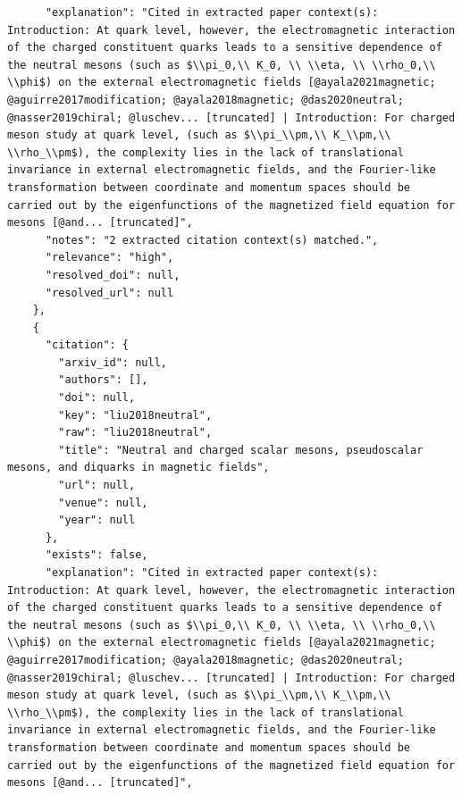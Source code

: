 \documentclass[11pt]{article}
\begin{document}
\begin{verbatim}
      "explanation": "Cited in extracted paper context(s): Introduction: At quark level, however, the electromagnetic interaction of the charged constituent quarks leads to a sensitive dependence of the neutral mesons (such as $\\pi_0,\\ K_0, \\ \\eta, \\ \\rho_0,\\ \\phi$) on the external electromagnetic fields [@ayala2021magnetic; @aguirre2017modification; @ayala2018magnetic; @das2020neutral; @nasser2019chiral; @luschev... [truncated] | Introduction: For charged meson study at quark level, (such as $\\pi_\\pm,\\ K_\\pm,\\ \\rho_\\pm$), the complexity lies in the lack of translational invariance in external electromagnetic fields, and the Fourier-like transformation between coordinate and momentum spaces should be carried out by the eigenfunctions of the magnetized field equation for mesons [@and... [truncated]",
      "notes": "2 extracted citation context(s) matched.",
      "relevance": "high",
      "resolved_doi": null,
      "resolved_url": null
    },
    {
      "citation": {
        "arxiv_id": null,
        "authors": [],
        "doi": null,
        "key": "liu2018neutral",
        "raw": "liu2018neutral",
        "title": "Neutral and charged scalar mesons, pseudoscalar mesons, and diquarks in magnetic fields",
        "url": null,
        "venue": null,
        "year": null
      },
      "exists": false,
      "explanation": "Cited in extracted paper context(s): Introduction: At quark level, however, the electromagnetic interaction of the charged constituent quarks leads to a sensitive dependence of the neutral mesons (such as $\\pi_0,\\ K_0, \\ \\eta, \\ \\rho_0,\\ \\phi$) on the external electromagnetic fields [@ayala2021magnetic; @aguirre2017modification; @ayala2018magnetic; @das2020neutral; @nasser2019chiral; @luschev... [truncated] | Introduction: For charged meson study at quark level, (such as $\\pi_\\pm,\\ K_\\pm,\\ \\rho_\\pm$), the complexity lies in the lack of translational invariance in external electromagnetic fields, and the Fourier-like transformation between coordinate and momentum spaces should be carried out by the eigenfunctions of the magnetized field equation for mesons [@and... [truncated]",

\end{verbatim}
\end{document}
